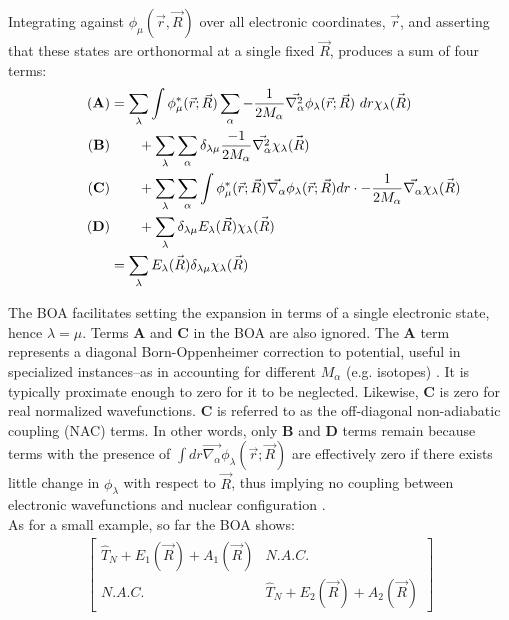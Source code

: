\documentclass[letterpaper, 12pt, oneside]{report}
\begin{document}
%
Integrating against $\phi_{\mu} (\Vec{r},\Vec{R})$ over all electronic coordinates, $\Vec{r}$, and asserting that these states are orthonormal at a single fixed $\Vec{R}$, produces a sum of four terms:
 \begin{align} 
   \tag{\textbf{A}}\label{eq:A2}
     &= \sum_{\lambda} \int \phi_{\mu}^{*} (\Vec{r};\Vec{R}) \sum_{\alpha} - \frac{1}{2M_{\alpha}} \Vec{\nabla_{\alpha}^{2}} \phi_{\lambda} (\Vec{r};\Vec{R})~dr \chi_{\lambda} \Vec{(R)}
 \\  \tag{\textbf{B}}\label{eq:B2}
     &\qquad+ \sum_{\lambda} \sum_{\alpha} \delta_{\lambda \mu} \frac{-1}{2M_{\alpha}} \Vec{\nabla_{\alpha}^{2}}  \chi_{\lambda} \Vec{(R)}
     \\  \tag{\textbf{C}}\label{eq:C2}
     &\qquad+ \sum_{\lambda} \sum_{\alpha} \int \phi_{\mu}^{*} (\Vec{r};\Vec{R}) \Vec{\nabla_{\alpha}} \phi_{\lambda} (\Vec{r};\Vec{R}) dr \cdot - \frac{1}{2M_{\alpha}} \Vec{\nabla_{\alpha}} \chi_{\lambda} \Vec{(R)}
     \\  \tag{\textbf{D}}\label{eq:D2}
     &\qquad+ \sum_{\lambda} \delta_{\lambda \mu} E_{\lambda} (\Vec{R}) \chi_{\lambda} \Vec{(R)}
     \\ &= \sum_{\lambda} E_{\lambda} \Vec{(R)}  \delta_{\lambda \mu} \chi_{\lambda} \Vec{(R)}
 \end{align}

The BOA facilitates setting the expansion in terms of a single electronic state, hence $\lambda = \mu$. Terms \textbf{A} and \textbf{C} in the BOA are also ignored. The \textbf{A} term represents a diagonal Born-Oppenheimer correction to potential, useful in specialized instances--as in accounting for different $M_{\alpha}$ (e.g. isotopes) \cite{nooijennotes}. It is typically proximate enough to zero for it to be neglected. Likewise, \textbf{C} is zero for real normalized wavefunctions. \textbf{C} is referred to as the off-diagonal non-adiabatic coupling (NAC) terms. In other words, only \textbf{B} and \textbf{D} terms remain because terms with the presence of $\int dr \Vec{\nabla_{\alpha}} \phi_{\lambda} (\Vec{r};\Vec{R})$ are effectively zero if there exists little change in $\phi_{\lambda}$ with respect to $\Vec{R}$, thus implying no coupling between electronic wavefunctions and nuclear configuration \cite{nooijennotes}. 
\\
As for a small example, so far the BOA shows:
\begin{equation}%
    \begin{split}
        \begin{bmatrix}
            \hat{T}_N + E_{1}(\Vec{R}) + A_{1}(\Vec{R}) & N.A.C.\\
            N.A.C.& \hat{T}_N + E_{2}{(\Vec{R}) + A_{2}(\Vec{R})}
        \end{bmatrix}
    \end{split}
\end{equation}
\end{document}
